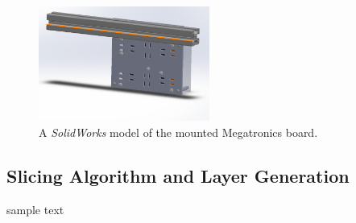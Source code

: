 \begin{figure}[htp]
\centering
\includegraphics[width=0.5\textwidth]{./figures/megatronics-mount-2}
\caption{A \emph{SolidWorks} model of the mounted Megatronics board.}
\label{fig:megatronics mount front}
\end{figure}




\subsection{Slicing Algorithm and Layer Generation}

\indent

sample text
